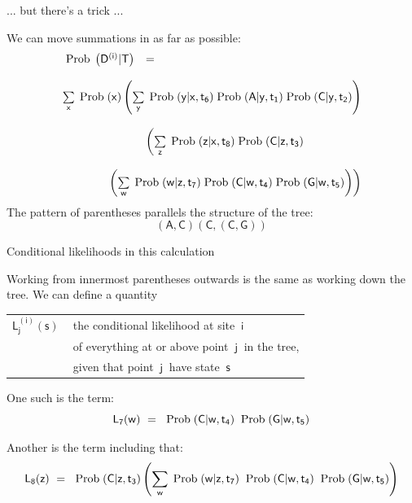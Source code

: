\documentclass[bluish,slideColor,colorBG,pdf]{prosper}
\def\prob{{\rm \;Prob\;}}
\begin{document}
\begin{slide}[Replace]{ ... but there's a trick ... }

We can move summations in as far as possible:
\[
\begin{array}{c l}
\mathsf{\prob\left(D^{(i)}|T\right)} & \mathsf{=}\\
& \\
\multicolumn{2}{r}{\mathsf{\sum\limits_x \prob(x) \left( \sum\limits_y \prob(y|x,t_6)
\prob(A|y, t_1)
\prob(C|y, t_2)\right)}}\\
& \\
&  \mathsf{\left(\sum\limits_z  \prob(z|x, t_8) \prob(C|z, t_3) \right.} \\
& \\
\multicolumn{2}{r}{\mathsf{\left.\left(\sum\limits_w \prob(w|z, t_7) \prob(C|w, t_4) \prob(G|w, t_5)\right)\right)}}
\end{array}
\]
The pattern of parentheses parallels the structure of the tree:
\[
\mathsf{\left(A,C\right)\left(C,\left(C,G\right)\right)}
\]

\end{slide}

\begin{slide}[Replace]{Conditional likelihoods in this calculation}
\bigskip

Working from innermost parentheses outwards is the same as working down the tree.
We can define a quantity
\bigskip

\begin{tabular}{l l}
$\mathsf{L^{(i)}_j(s)}~$ & the conditional likelihood at site $~\mathsf{i}$\\
& of everything at or above point $~\mathsf{j}~$ in the tree,\\
& given that point $~\mathsf{j}~$ have state $~\mathsf{s}$
\end{tabular}
\bigskip

One such is the term:
\[
\mathsf{L_7(w)\ = \ \prob(C|w, t_4)\;\prob(G|w, t_5)}
\]

Another is the term including that:
\[
\mathsf{L_8(z) \ = \  \prob(C|z, t_3)\left(\sum_w \prob(w|z, t_7)\;\prob(C|w, t_4)\;\prob(G|w, t_5)\right)}
\]
\end{slide}
\end{document}
